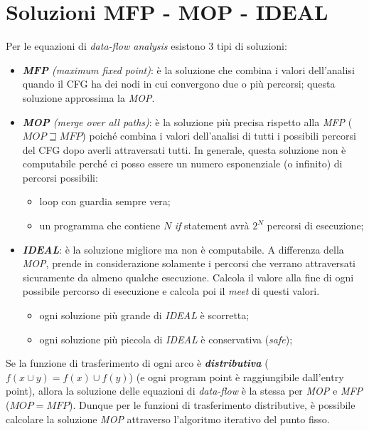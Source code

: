 \documentclass[a4paper, 10pt]{book}
\begin{document}
\section{Soluzioni MFP - MOP - IDEAL}
Per le equazioni di \textit{data-flow analysis} esistono 3 tipi di soluzioni:
\begin{itemize}
	\item \textit{\textbf{MFP} (maximum fixed point)}: è la soluzione che combina i valori dell'analisi quando il CFG ha dei nodi in cui convergono due o più percorsi; questa soluzione approssima la \textit{MOP}.
	\item \textit{\textbf{MOP} (merge over all paths)}: è la soluzione più precisa rispetto alla \textit{MFP} ($MOP \sqsupseteq MFP$) poiché combina i valori dell'analisi di tutti i possibili percorsi del CFG dopo averli attraversati tutti. In generale, questa soluzione non è computabile perché ci posso essere un numero esponenziale (o infinito) di percorsi possibili:
	\begin{itemize}
		\item loop con guardia sempre vera;
		\item un programma che contiene $N$ \textit{if} statement avrà $2^N$ percorsi di esecuzione;
	\end{itemize}
	\item \textbf{\textit{IDEAL}}: è la soluzione migliore ma non è computabile. A differenza della \textit{MOP}, prende in considerazione solamente i percorsi che verrano attraversati sicuramente da almeno qualche esecuzione. Calcola il valore alla fine di ogni possibile percorso di esecuzione e calcola poi il \textit{meet} di questi valori.
	\begin{itemize}
		\item ogni soluzione più grande di \textit{IDEAL} è scorretta;
		\item ogni soluzione più piccola di \textit{IDEAL} è conservativa (\textit{safe});
	\end{itemize}
\end{itemize}
Se la funzione di trasferimento di ogni arco è \textbf{\textit{distributiva}} ($f(x \cup y) = f(x) \cup f(y)$) (e ogni program point è raggiungibile dall'entry point), allora la soluzione delle equazioni di \textit{data-flow} è la stessa per \textit{MOP} e \textit{MFP} ($MOP = MFP$). Dunque per le funzioni di trasferimento distributive, è possibile calcolare la soluzione \textit{MOP} attraverso l'algoritmo iterativo del punto fisso.
\newline
\end{document}
